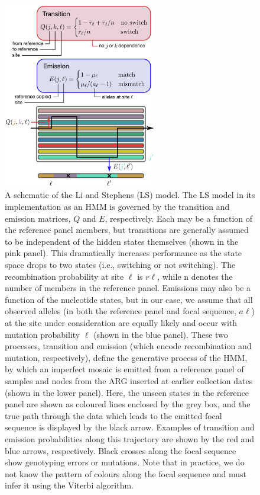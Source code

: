 \documentclass{article}
\begin{document}
\begin{figure} \centering
\includegraphics[width=0.6\textwidth]{figures/ls_diagram_covid.pdf}
\caption{\label{fig:ls_diagram} A schematic of the Li and Stephens (LS) model.
The LS model in its implementation as an HMM is governed by the transition and
emission matrices, $Q$ and $E$, respectively. Each may be a function of the
reference panel members, but transitions are generally assumed to be
independent of the hidden states themselves (shown in the pink panel). This
dramatically increases performance as the state space drops to two states
(i.e., switching or not switching). The recombination probability at site
$\ell$ is $r\ell$, while n denotes the number of members in the reference
panel. Emissions may also be a function of the nucleotide states, but in our
case, we assume that all observed alleles (in both the reference panel and
focal sequence, $a\ell$) at the site under consideration are equally likely and
occur with mutation probability $\ell$ (shown in the blue panel). These two
processes, transition and emission (which encode recombination and mutation,
respectively), define the generative process of the HMM, by which an imperfect
mosaic is emitted from a reference panel of samples and nodes from the ARG
inserted at earlier collection dates (shown in the lower panel). Here, the
unseen states in the reference panel are shown as coloured lines enclosed by
the grey box, and the true path through the data which leads to the emitted
focal sequence is displayed by the black arrow. Examples of transition and
emission probabilities along this trajectory are shown by the red and blue
arrows, respectively. Black crosses along the focal sequence show genotyping
errors or mutations. Note that in practice, we do not know the pattern of
colours along the focal sequence and must infer it using the Viterbi
algorithm.} \end{figure}
\end{document}
